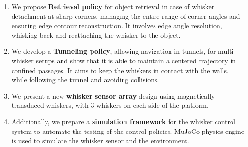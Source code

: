 \begin{enumerate}
    \item We propose \textbf{Retrieval policy} for object retrieval in case of whisker detachment at sharp corners, managing the entire range of corner angles and ensuring edge contour reconstruction.
    It involves edge angle resolution, whisking back and reattaching the whisker to the object.
    \item We develop a \textbf{Tunneling policy}, allowing navigation in tunnels, for multi-whisker setups and show that it is able to maintain a centered trajectory in confined passages.
    It aims to keep the whiskers in contact with the walls, while following the tunnel and avoiding collisions.
    \item We present a new \textbf{whisker sensor array} design using magnetically transduced whiskers, with 3 whiskers on each side of the platform.
    \item Additionally, we prepare a \textbf{simulation framework} for the whisker control system to automate the testing of the control policies.
    MuJoCo physics engine is used to simulate the whisker sensor and the environment.
\end{enumerate}
